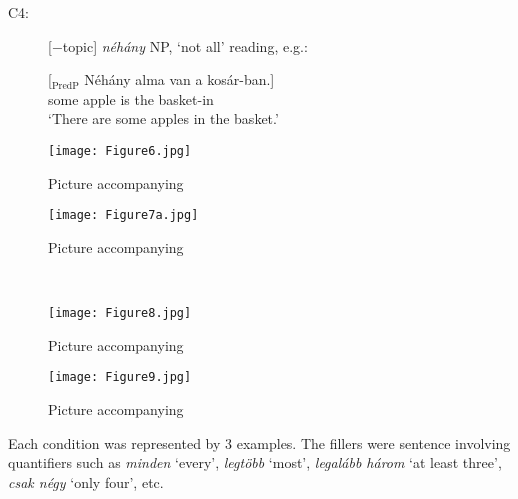 \documentclass[output=paper]{langscibook}
\begin{document}
\begin{description}


\item[C4:] [$-$topic] \textit{néhány} NP, `not all' reading, e.g.:

\ea
\gll \label{kis-zet:alma}[$_\text{PredP}$ Néhány alma van a kosár-ban.]\\ 
{} some apple is the basket-in\\ 
\glt ‘There are some apples in the basket.’
\z


\end{description}

\begin{figure}[h]
\RawFloats
\centering
\begin{minipage}[b]{0.49\textwidth}
    \centering
    \texttt{[image: Figure6.jpg]}
    \caption{Picture accompanying }
    \label{kis-zet:c1}
\end{minipage}
\begin{minipage}[b]{0.49\textwidth}
    \centering
    \texttt{[image: Figure7a.jpg]}
    \caption{Picture accompanying }
    \label{kis-zet:c2}
\end{minipage}
~
\begin{minipage}[b]{0.49\textwidth}
    \centering
    \texttt{[image: Figure8.jpg]}
    \caption{Picture accompanying }
    \label{kis-zet:c3}
\end{minipage}
\begin{minipage}[b]{0.49\textwidth}
    \centering
    \texttt{[image: Figure9.jpg]}
    \caption{Picture accompanying }
    \label{kis-zet:c4}
\end{minipage}
\end{figure}

Each condition was represented by 3 examples. The fillers were sentence involving quantifiers such as  \textit{minden} `every',  \textit{legtöbb} `most',  \textit{legalább három} `at least three', \textit{csak négy} `only four', etc.
\end{document}
